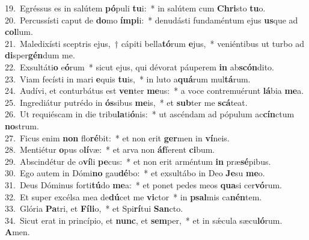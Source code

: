 {19.~}Egréssus es in salútem \textbf{pó}puli \textbf{tu}i:~* in salútem cum \textbf{Chri}sto \textbf{tu}o.\\
{20.~}Percussísti caput de \textbf{do}mo \textbf{ím}\textbf{pi}i:~* denudásti fundaméntum ejus \textbf{us}que ad \textbf{col}lum.\\
{21.~}Maledixísti sceptris ejus,~† cápiti bella\textbf{tó}rum \textbf{e}jus,~* veniéntibus ut turbo ad \textbf{di}sper\textbf{gén}dum me.\\
{22.~}Exsultáti\textbf{o} e\textbf{ó}rum~* sicut ejus, qui dévorat páuperem \textbf{in} ab\textbf{scón}dito.\\
{23.~}Viam fecísti in mari \textbf{e}quis \textbf{tu}is,~* in luto a\textbf{quá}rum mul\textbf{tá}rum.\\
{24.~}Audívi, et conturbátus est \textbf{ven}ter \textbf{me}us:~* a voce contremuérunt \textbf{lá}bia \textbf{me}a.\\
{25.~}Ingrediátur putrédo in \textbf{ós}sibus \textbf{me}is,~* et \textbf{sub}ter me \textbf{scá}teat.\\
{26.~}Ut requiéscam in die tribu\textbf{la}ti\textbf{ó}nis:~* ut ascéndam ad pópulum ac\textbf{cín}ctum \textbf{no}strum.\\
{27.~}Ficus enim \textbf{non} flo\textbf{ré}bit:~* et non erit \textbf{ger}men in \textbf{ví}neis.\\
{28.~}Mentiétur \textbf{o}pus o\textbf{lí}væ:~* et arva non \textbf{áf}ferent \textbf{ci}bum.\\
{29.~}Abscindétur de o\textbf{ví}li \textbf{pe}cus:~* et non erit arméntum \textbf{in} præ\textbf{sé}pibus.\\
{30.~}Ego autem in Dómi\textbf{no} gau\textbf{dé}bo:~* et exsultábo in Deo \textbf{Je}su \textbf{me}o.\\
{31.~}Deus Dóminus forti\textbf{tú}do \textbf{me}a:~* et ponet pedes meos \textbf{qua}si cer\textbf{vó}rum.\\
{32.~}Et super excélsa mea de\textbf{dú}cet me \textbf{vi}ctor~* in \textbf{psal}mis ca\textbf{nén}tem.\\
{33.~}Glória \textbf{Pa}tri, et \textbf{Fí}\textbf{li}o,~* et Spi\textbf{rí}tui \textbf{San}cto.\\
{34.~}Sicut erat in princípio, et \textbf{nunc}, et \textbf{sem}per,~* et in sǽcula sæcu\textbf{ló}rum. \textbf{A}men.\\
